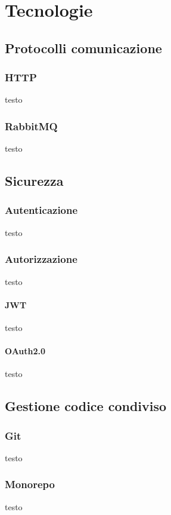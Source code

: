 \chapter{Tecnologie}








\section{Protocolli comunicazione}
\subsection{HTTP}
testo
\subsection{RabbitMQ}
testo

\section{Sicurezza}
\subsection{Autenticazione}
testo
\subsection{Autorizzazione}
testo
\subsubsection{JWT}
testo
\subsubsection{OAuth2.0}
testo

\section{Gestione codice condiviso}
\subsection{Git}
testo

\subsection{Monorepo}
testo

